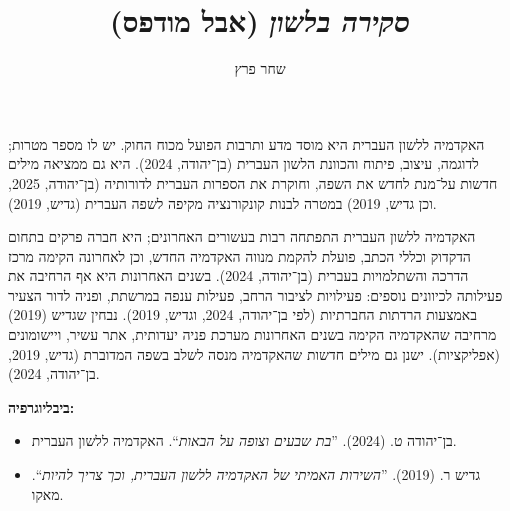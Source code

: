 \documentclass[]{../../../tex/classes/styledArticle}
\author{שחר פרץ}
\title{\textit{סקירה בלשון} (אבל מודפס)}
\begin{document}
	\maketitle
	
	\large 
	האקדמיה ללשון העברית היא מוסד מדע ותרבות הפועל מכוח החוק. יש לו מספר מטרות; לדוגמה, עיצוב, פיתוח והכוונת הלשון העברית (בן־יהודה, 2024). היא גם ממציאה מילים חדשות על־מנת לחדש את השפה, וחוקרת את הספרות העברית לדורותיה (בן־יהודה, 2025, וכן גדיש, 2019) במטרה לבנות קונקורנציה מקיפה לשפה העברית (גדיש, 2019). 
	
	האקדמיה ללשון העברית התפתחה רבות בעשורים האחרונים; היא חברה פרקים בתחום הדקדוק וכללי הכתב, פועלת להקמת מנווה האקדמיה החדש, וכן לאחרונה הקימה מרכז הדרכה והשתלמויות בעברית (בן־יהודה, 2024). בשנים האחרונות היא אף הרחיבה את פעילותה לכיוונים נוספים: פעילויות לציבור הרחב, פעילות ענפה במרשתת, ופניה לדור הצעיר באמצעות הרדתות החברתיות (לפי בן־יהודה, 2024, וגדיש, 2019). נבחין שגדיש (2019) מרחיבה שהאקדמיה הקימה בשנים האחרונות מערכת פניה יעדותית, אתר עשיר, ויישומונים (אפליקציות). ישנן גם מילים חדשות שהאקדמיה מנסה לשלב בשפה המדוברת (גדיש, 2019, בן־יהודה, 2024). 
	
	\textbf{ביבליוגרפיה: }
	\begin{itemize}
		\item בן־יהודה ט. (2024). ''\textit{בת שבעים וצופה על הבאות}``. האקדמיה ללשון העברית. 
		\item גדיש ר. (2019). ''\textit{השירות האמיתי של האקדמיה ללשון העברית, וכך צריך להיות}``. מאקו. 
	\end{itemize}
	
	
\end{document}
